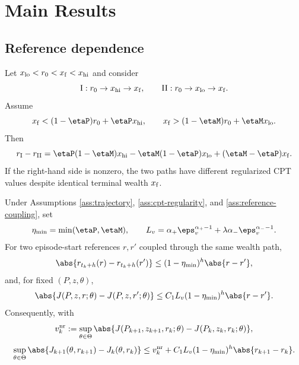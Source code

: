 \section{Main Results}\label{sec:results}

\subsection{Reference dependence}

\begin{proposition}\label{prop:path-dependence}
Let $x_{\rm lo}<r_0<x_{\rm f}<x_{\rm hi}$ and consider
\[
 \mathrm{I}: r_0\to x_{\rm hi}\to x_{\rm f},
 \qquad
 \mathrm{II}: r_0\to x_{\rm lo}\to x_{\rm f}.
\]
Assume
\[
 x_{\rm f}<(1-\etaP)r_0+\etaP x_{\rm hi},
 \qquad
 x_{\rm f}>(1-\etaM)r_0+\etaM x_{\rm lo}.
\]
Then
\begin{equation}\label{eq:path-reference-gap}
 r_{\rm I}-r_{\rm II}
 =\etaP(1-\etaM)x_{\rm hi}
 -\etaM(1-\etaP)x_{\rm lo}
 +(\etaM-\etaP)x_{\rm f}.
\end{equation}
If the right-hand side is nonzero, the two paths have different regularized CPT values despite identical terminal wealth $x_{\rm f}$.
\end{proposition}

\begin{proposition}\label{prop:reference-sensitivity}
Under Assumptions \ref{ass:trajectory}, \ref{ass:cpt-regularity}, and \ref{ass:reference-coupling}, set
\begin{equation}\label{eq:reference-constants}
 \eta_{\min}=\min(\etaP,\etaM),
 \qquad
 L_v=\alpha_+\eps_v^{\alpha_+-1}
 +\lambda\alpha_-\eps_v^{\alpha_--1}.
\end{equation}
For two episode-start references $r,r'$ coupled through the same wealth path,
\begin{equation}\label{eq:reference-contraction}
 \abs{r_{t_k+h}(r)-r_{t_k+h}(r')}
 \le(1-\eta_{\min})^h\abs{r-r'},
\end{equation}
and, for fixed $(P,z,\theta)$,
\begin{equation}\label{eq:reference-value-sensitivity}
 \abs{J(P,z,r;\theta)-J(P,z,r';\theta)}
 \le C_1L_v(1-\eta_{\min})^h\abs{r-r'}.
\end{equation}
Consequently, with
\[
 v_k^{\rm nr}
 :=\sup_{\theta\in\Theta}
 \abs{J(P_{k+1},z_{k+1},r_k;\theta)-J(P_k,z_k,r_k;\theta)},
\]
\begin{equation}\label{eq:variation-decomposition}
 \sup_{\theta\in\Theta}
 \abs{J_{k+1}(\theta,r_{k+1})-J_k(\theta,r_k)}
 \le v_k^{\rm nr}
 +C_1L_v(1-\eta_{\min})^h\abs{r_{k+1}-r_k}.
\end{equation}
\end{proposition}

